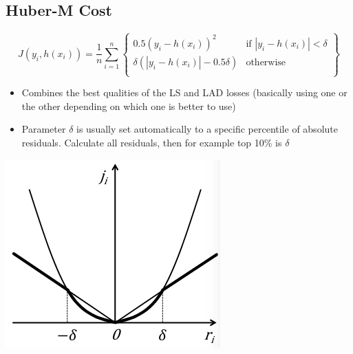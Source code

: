 \documentclass{article}[18pt]
\begin{document}
\subsection{Huber-M Cost}
$$J(y_i,h(x_i))=\dfrac{1}{n}\sum_{i=1}^{n}\left\{\begin{array}{lr}
0.5(y_i-h(x_i))^2 & \text{if } |y_i-h(x_i)|<\delta\\
\delta({|y_i-h(x_i)|}-0.5\delta) & \text{otherwise}\\
\end{array}\right\}$$
\begin{itemize}
	\item Combines the best qualities of the LS and LAD losses (basically using one or the other depending on which one is better to use)
	\item Parameter $\delta$ is usually set automatically to a specific percentile of absolute residuals. Calculate all residuals, then for example top 10\% is $\delta$
\end{itemize}
\begin{center}
	\includegraphics[scale=0.7]{Huber-M}
\end{center}
\newpage
\end{document}
